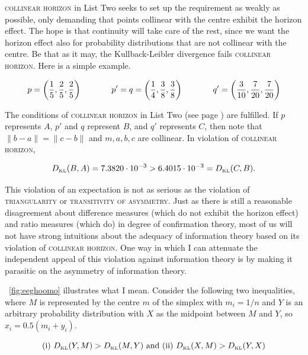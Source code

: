 \documentclass[phd,12pt,oneside]{ubcthesis}
\begin{document}
\textsc{collinear horizon} in List Two seeks to set up the requirement
as weakly as possible, only demanding that points collinear with the
centre exhibit the horizon effect. The hope is that continuity will
take care of the rest, since we want the horizon effect also for
probability distributions that are not collinear with the centre. Be
that as it may, the Kullback-Leibler divergence fails
\textsc{collinear horizon}. Here is a simple example.

\begin{equation}
  \label{eq:ubiesohx}
    p=\left(\frac{1}{5},\frac{2}{5},\frac{2}{5}\right) \hspace{.5in}
    p'=q=\left(\frac{1}{4},\frac{3}{8},\frac{3}{8}\right)  \hspace{.5in}
    q'=\left(\frac{3}{10},\frac{7}{20},\frac{7}{20}\right)
\end{equation}

{\noindent}The conditions of \textsc{collinear horizon} in List Two (see page
\pageref{page:listtwo}) are fulfilled. If $p$ represents $A$, $p'$ and
$q$ represent $B$, and $q'$ represents $C$, then note that
$\|b-a\|=\|c-b\|$ and $m,a,b,c$ are collinear. In violation of
\textsc{collinear horizon},

\begin{equation}
  \label{eq:eiloothu}
  D_{\mbox{\tiny KL}}(B,A)=7.3820\cdot{}10^{-3}>6.4015\cdot{}10^{-3}=D_{\mbox{\tiny KL}}(C,B).
\end{equation}

This violation of an expectation is not as serious as the violation of
\textsc{triangularity} or \textsc{transitivity of asymmetry}. Just as
there is still a reasonable disagreement about difference measures
(which do not exhibit the horizon effect) and ratio measures (which
do) in degree of confirmation theory, most of us will not have strong
intuitions about the adequacy of information theory based on its
violation of \textsc{collinear horizon}. One way in which I can
attenuate the independent appeal of this violation against information
theory is by making it parasitic on the asymmetry of information
theory.

{\Igure}~\ref{fig:eeghoomo} illustrates what I mean. Consider the
following two inequalities, where $M$ is represented by the centre
$m$ of the simplex with $m_{i}=1/n$ and $Y$ is an arbitrary
probability distribution with $X$ as the midpoint between $M$ and $Y$,
so $x_{i}=0.5(m_{i}+y_{i})$.

\begin{equation}
  \label{eq:dailoosu}
  \mbox{(i) }D_{\mbox{\tiny KL}}(Y,M)>D_{\mbox{\tiny KL}}(M,Y)\mbox{ and (ii) }D_{\mbox{\tiny KL}}(X,M)>D_{\mbox{\tiny KL}}(Y,X)
\end{equation}
\end{document}
